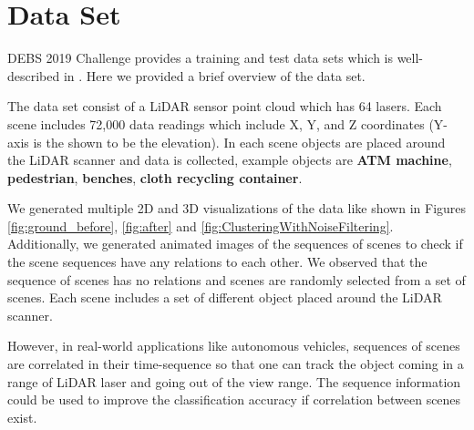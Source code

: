 \section{Data Set}
DEBS 2019  Challenge provides a training and test data sets which is well-described in \cite{DEBSGC2019}. 
Here we provided a brief overview of the data set. 
 
The data set consist of a LiDAR sensor point cloud which has 64 lasers. Each scene includes 72,000 data readings which include X, Y, and Z coordinates (Y-axis is the shown to be the elevation).
In each scene objects are placed around the LiDAR scanner and data is collected, example objects are \textbf{ATM machine}, \textbf{pedestrian}, \textbf{benches}, \textbf{cloth recycling container}.

We generated multiple 2D and 3D visualizations of the data like shown in Figures \ref{fig:ground_before},  \ref{fig:after} and \ref{fig:ClusteringWithNoiseFiltering}.
Additionally, we generated animated images of the sequences of scenes to check if the scene sequences have any relations to each other.
We observed that the sequence of scenes has no relations and scenes are randomly selected from a set of scenes. Each scene includes a set of different object placed around the LiDAR scanner.  

However, in real-world applications like autonomous vehicles, sequences of scenes are correlated in their time-sequence so that one can track the object coming in a range of LiDAR laser and going out of the view range.
The sequence information could be used to improve the classification accuracy if correlation between scenes exist.



%


